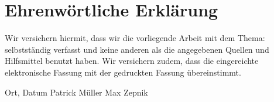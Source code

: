 
\chapter*{Ehrenwörtliche Erklärung}


Wir versichern hiermit, dass wir die vorliegende Arbeit  mit dem Thema:
 selbstständig verfasst und keine anderen als die angegebenen Quellen und Hilfsmittel benutzt haben. Wir versichern zudem,
dass die eingereichte elektronische Fassung mit der gedruckten Fassung übereinstimmt.

\vspace{3cm}
Ort, Datum \hfill Patrick Müller \hfill Max Zepnik